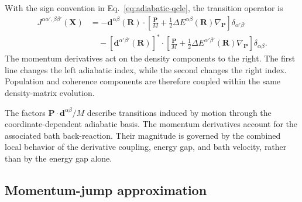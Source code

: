 \documentclass[
  11pt,
  letterpaper,
  onehalfspacing,
  normalmargins,
  equalmargins,
  oneside
]{ut-thesis}
\begin{document}
With the sign convention in Eq.~\eqref{eq:adiabatic-qcle}, the transition
operator is
\begin{align}
J^{\alpha\alpha',\beta\beta'}(\mathbf X)
&=
-
\mathbf d^{\alpha\beta}(\mathbf R)\cdot
\left[
\frac{\mathbf P}{M}
+
\frac{1}{2}
\Delta E^{\alpha\beta}(\mathbf R)
\nabla_{\mathbf P}
\right]
\delta_{\alpha'\beta'}
\nonumber\\
&\quad
-
\left[
\mathbf d^{\alpha'\beta'}(\mathbf R)
\right]^\ast\cdot
\left[
\frac{\mathbf P}{M}
+
\frac{1}{2}
\Delta E^{\alpha'\beta'}(\mathbf R)
\nabla_{\mathbf P}
\right]
\delta_{\alpha\beta}.
\label{eq:adiabatic-transition-operator}
\end{align}
The momentum derivatives act on the density components to the right. The
first line changes the left adiabatic index, while the second changes the
right index. Population and coherence components are therefore coupled within
the same density-matrix evolution.

The factors
\(\mathbf P\cdot\mathbf d^{\alpha\beta}/M\) describe transitions induced by
motion through the coordinate-dependent adiabatic basis. The momentum
derivatives account for the associated bath back-reaction. Their magnitude is
governed by the combined local behavior of the derivative coupling, energy
gap, and bath velocity, rather than by the energy gap alone.


\subsection{Momentum-jump approximation}
\label{subsec:momentum-jump-approximation}
\end{document}
